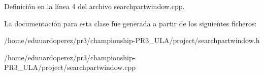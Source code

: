 Definición en la línea 4 del archivo searchpartwindow.\+cpp.



La documentación para esta clase fue generada a partir de los siguientes ficheros\+:\begin{DoxyCompactItemize}
\item 
/home/eduuardoperez/pr3/championship-\/\+P\+R3\+\_\+\+U\+L\+A/project/searchpartwindow.\+h\item 
/home/eduuardoperez/pr3/championship-\/\+P\+R3\+\_\+\+U\+L\+A/project/searchpartwindow.\+cpp\end{DoxyCompactItemize}
